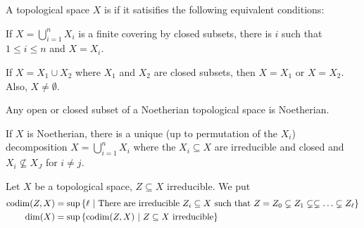 \documentclass[a4paper,parskip=full,numbers=enddot]{scrreprt}
\begin{document}
\begin{defi}
 A topological space $X$ is  if it satisifies the following equivalent conditions:
 \begin{alphanumerate}
    \item 
        If $X= \bigcup_{i=1}^n X_i$ is a finite covering by closed subsets, there is $i$ such that $1\leq i\leq n$ and $X=X_i$.
    \item
        If $X = X_1\cup X_2$ where $X_1$ and $X_2$ are closed subsets, then $X=X_1$ or $X=X_2$. Also, $X\neq\emptyset$.
 \end{alphanumerate}

\end{defi}
\begin{prop}
 \begin{alphanumerate}
    \item 
        Any open or closed subset of a Noetherian topological space is Noetherian.
    \item 
        If $X$ is Noetherian, there is a unique (up to permutation of the $X_i$) decomposition $X = \bigcup_{i=1}^n X_i$ where the $X_i\subseteq X$ are irreducible and closed and $X_i\not\subseteq X_J$ for $i\neq j$.
 \end{alphanumerate}

\end{prop}
\begin{defi}
 Let $X$ be a topological space, $Z\subseteq X$ irreducible. We put 
 \begin{align*}
    \operatorname{codim}(Z,X) &= \sup\left\{\ell\ \middle|\  \text{There are irreducible } Z_i\subseteq X \text{ such that } Z=Z_0 \subsetneq Z_1\subsetneq \subsetneq \ldots \subsetneq Z_\ell\right\}\\
    \dim(X) &= \sup\left\{\operatorname{codim}(Z,X)\ \middle|\  Z\subseteq X \text{ irreducible}\right\}
 \end{align*}

\end{defi}
\end{document}
